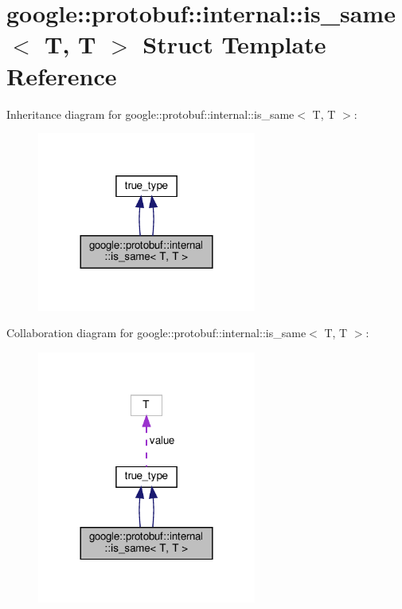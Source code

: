 \hypertarget{structgoogle_1_1protobuf_1_1internal_1_1is__same_3_01T_00_01T_01_4}{}\section{google\+:\+:protobuf\+:\+:internal\+:\+:is\+\_\+same$<$ T, T $>$ Struct Template Reference}
\label{structgoogle_1_1protobuf_1_1internal_1_1is__same_3_01T_00_01T_01_4}


Inheritance diagram for google\+:\+:protobuf\+:\+:internal\+:\+:is\+\_\+same$<$ T, T $>$\+:
\nopagebreak
\begin{figure}[H]
\begin{center}
\leavevmode
\includegraphics[width=204pt]{structgoogle_1_1protobuf_1_1internal_1_1is__same_3_01T_00_01T_01_4__inherit__graph}
\end{center}
\end{figure}


Collaboration diagram for google\+:\+:protobuf\+:\+:internal\+:\+:is\+\_\+same$<$ T, T $>$\+:
\nopagebreak
\begin{figure}[H]
\begin{center}
\leavevmode
\includegraphics[width=204pt]{structgoogle_1_1protobuf_1_1internal_1_1is__same_3_01T_00_01T_01_4__coll__graph}
\end{center}
\end{figure}

